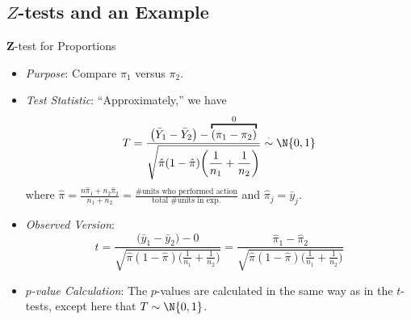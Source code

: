 \subsection*{$ Z $-tests and an Example}
\begin{Statistical_Test}{$ \symbf{Z} $-test for Proportions}{}
      \begin{itemize}
            \item \emph{Purpose}: Compare $ \pi_1 $ versus $ \pi_2 $.
            \item \emph{Test Statistic}: ``Approximately,'' we have
                  \[ T=\frac{\bigl(\bar{Y}_1-\bar{Y}_2\bigr)-
                              \overbracket{(\pi_1-\pi_2)}^0}{\displaystyle \sqrt{\hat{\pi}(1-\hat{\pi})\biggl(\frac{1}{n_1} +\frac{1}{n_2} \biggr)}}\stackrel{\cdot}{\sim}\N{0,1} \]
                  where $ \displaystyle \hat{\pi}=\frac{n\hat{\pi}_1+n_2\hat{\pi}_2}{n_1+n_2}=\frac{\text{\# units who performed action}}{\text{total \# units in exp.}} $
                  and $ \hat{\pi}_j=\bar{y}_j $.
            \item \emph{Observed Version}:
                  \[ t=\frac{\bigl(\bar{y}_1-\bar{y}_2\bigr)-0}{\displaystyle \sqrt{\hat{\pi}(1-\hat{\pi})\biggl(\frac{1}{n_1} +\frac{1}{n_2} \biggr)}}=
                        \frac{\hat{\pi}_1-\hat{\pi}_2}{\displaystyle \sqrt{\hat{\pi}(1-\hat{\pi})\biggl(\frac{1}{n_1} +\frac{1}{n_2} \biggr)}}\]
            \item \emph{$ p $-value Calculation}: The $ p $-values are calculated
                  in the same way as in the $ t $-tests, except here that $ T \sim \N{0,1} $.
      \end{itemize}
\end{Statistical_Test}
